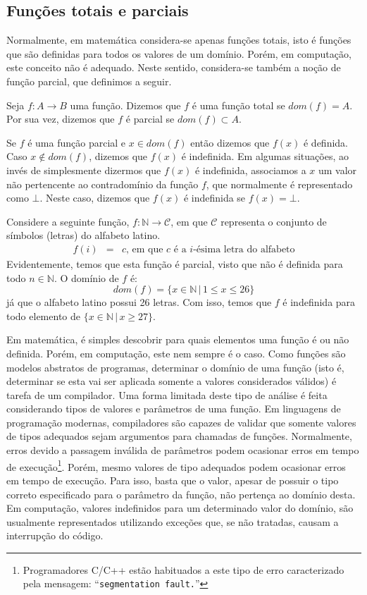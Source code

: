 \subsection{Funções totais e parciais}

Normalmente, em matemática considera-se apenas funções totais, isto é
funções que são definidas para todos os valores de um domínio. Porém,
em computação, este conceito não é adequado. Neste sentido,
considera-se também a noção de função parcial, que definimos a seguir.

\begin{Definition}
Seja $f : A \to B$ uma função. Dizemos que $f$ é uma função total se
$dom(f) = A$. Por sua vez, dizemos que $f$ é parcial se $dom(f)
\subset A$.
\end{Definition}

Se $f$ é uma função parcial e $x\in dom(f)$ então dizemos que $f(x)$ é
definida. Caso $x\not\in dom(f)$, dizemos que $f(x)$ é
indefinida. Em algumas situações, ao invés de simplesmente dizermos
que $f(x)$ é indefinida, associamos a $x$ um valor não pertencente ao
contradomínio da função $f$, que normalmente é representado como
$\bot$. Neste caso, dizemos que $f(x)$ é indefinida se $f(x) = \bot$.

\begin{Example}
Considere a seguinte função, $f : \mathbb{N} \to \mathcal{C}$, em que
$\mathcal{C}$ representa o conjunto de símbolos (letras) do alfabeto latino.
\[
\begin{array}{lcl}
f(i) & = & c \text{, em que $c$ é a $i$-ésima letra do alfabeto}
\end{array}
\]
Evidentemente, temos que esta função é parcial, visto que não é
definida para todo $n \in \mathbb{N}$. O domínio de $f$ é:
\[
dom(f) =\{x \in\mathbb{N}\,|\,1 \leq x \leq 26\}
\]
já que o alfabeto latino possui 26 letras. Com isso, temos que $f$ é
indefinida para todo elemento de $\{x\in\mathbb{N}\,|\,x \geq 27\}$.
\end{Example}
Em matemática, é simples descobrir para quais elementos uma função é
ou não definida. Porém, em computação, este nem sempre é o
caso. Como funções são modelos abstratos de programas, determinar o
domínio de uma função (isto é, determinar se esta vai ser aplicada
somente a valores considerados válidos) é tarefa de um compilador.
Uma forma limitada deste tipo de análise é feita considerando tipos de valores e
parâmetros de uma função. Em linguagens de programação modernas,
compiladores são capazes de validar que somente valores de tipos
adequados sejam argumentos para chamadas de funções. Normalmente,
erros devido a passagem inválida de parâmetros podem ocasionar erros
em tempo de execução\footnote{Programadores C/C++ estão habituados a
  este tipo de erro caracterizado pela mensagem:
  ``\texttt{segmentation fault.}''}. Porém, mesmo valores de tipo
adequados podem ocasionar erros em tempo de execução. Para isso, basta
que o valor, apesar de possuir o tipo correto especificado para o
parâmetro da função, não pertença ao domínio desta. Em computação,
valores indefinidos para um determinado valor do domínio, são
usualmente representados utilizando exceções que, se não tratadas,
causam a interrupção do código.

